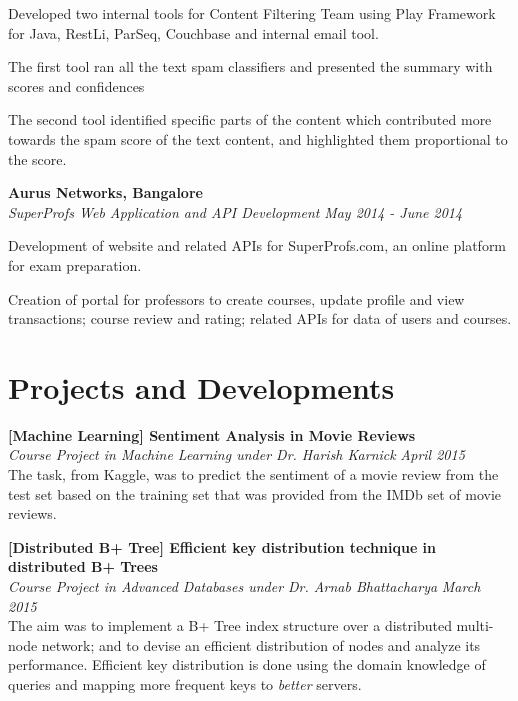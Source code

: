 \documentclass[margin,10pt]{resume}
\begin{document}
\begin{resume}
\begin{list2}
	\begin{list3}
	\item Developed two internal tools for Content Filtering Team using Play Framework for Java, RestLi, ParSeq, Couchbase and internal email tool.
	\item The first tool ran all the text spam classifiers and presented the summary with scores and confidences
	\item The second tool identified specific parts of the content which contributed more towards the spam score of the text content, and highlighted them proportional to the score.  
	\end{list3}

	\vspace{13mm}	

\item \textbf{Aurus Networks, Bangalore}\\
\textsl{SuperProfs Web Application and API Development} \hfill \emph{May 2014 - June 2014}

	\begin{list3}
	\item Development of website and related APIs for SuperProfs.com, an online platform for exam preparation.\vspace{1mm}
	\item Creation of portal for professors to create courses, update profile and view transactions; course review and rating; related APIs for data of users and courses. 
	\end{list3}
\end{list2}

\newpage
\section{\mysidestyle Projects and Developments}
\begin{list2}

\item \textbf{[Machine Learning] Sentiment Analysis in Movie Reviews}\\
	\textsl{Course Project in Machine Learning under Dr. Harish Karnick} \hfill \emph{April 2015}\\
	The task, from Kaggle, was to predict the sentiment of a movie review from the test set based on the training set that was provided from the IMDb set of movie reviews.

	\vspace{4mm}

\item \textbf{[Distributed B+ Tree] Efficient key distribution technique in distributed B+ Trees}\\
	\textsl{Course Project in Advanced Databases under Dr. Arnab Bhattacharya} \hfill \emph{March 2015}\\
	The aim was to implement a B+ Tree index structure over a distributed multi-node network; and to devise an efficient distribution of nodes and analyze its performance. Efficient key distribution is done using the domain knowledge of queries and mapping more frequent keys to \textit{better} servers.


\end{list2}
\end{resume}
\end{document}
